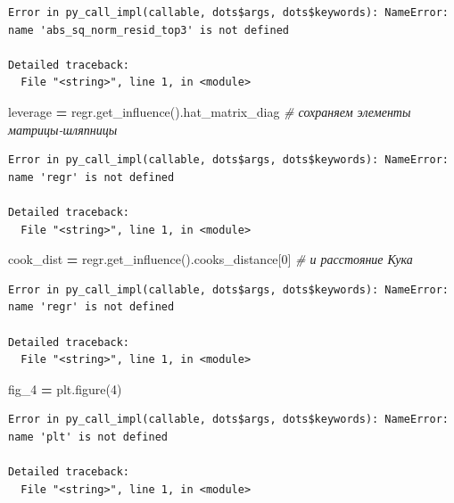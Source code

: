 \documentclass[]{book}
\newenvironment{Shaded}{\begin{snugshade}}{\end{snugshade}}
\newcommand{\CommentTok}[1]{\textcolor[rgb]{0.56,0.35,0.01}{\textit{#1}}}
\newcommand{\DecValTok}[1]{\textcolor[rgb]{0.00,0.00,0.81}{#1}}
\newcommand{\NormalTok}[1]{#1}
\newcommand{\OperatorTok}[1]{\textcolor[rgb]{0.81,0.36,0.00}{\textbf{#1}}}
\begin{document}
\begin{verbatim}
Error in py_call_impl(callable, dots$args, dots$keywords): NameError: name 'abs_sq_norm_resid_top3' is not defined

Detailed traceback: 
  File "<string>", line 1, in <module>
\end{verbatim}

\begin{Shaded}
\begin{Highlighting}[]
\NormalTok{leverage }\OperatorTok{=}\NormalTok{ regr.get_influence().hat_matrix_diag }\CommentTok{# сохраняем элементы матрицы-шляпницы}
\end{Highlighting}
\end{Shaded}

\begin{verbatim}
Error in py_call_impl(callable, dots$args, dots$keywords): NameError: name 'regr' is not defined

Detailed traceback: 
  File "<string>", line 1, in <module>
\end{verbatim}

\begin{Shaded}
\begin{Highlighting}[]
\NormalTok{cook_dist }\OperatorTok{=}\NormalTok{ regr.get_influence().cooks_distance[}\DecValTok{0}\NormalTok{] }\CommentTok{# и расстояние Кука}
\end{Highlighting}
\end{Shaded}

\begin{verbatim}
Error in py_call_impl(callable, dots$args, dots$keywords): NameError: name 'regr' is not defined

Detailed traceback: 
  File "<string>", line 1, in <module>
\end{verbatim}

\begin{Shaded}
\begin{Highlighting}[]
\NormalTok{fig_4 }\OperatorTok{=}\NormalTok{ plt.figure(}\DecValTok{4}\NormalTok{)}
\end{Highlighting}
\end{Shaded}

\begin{verbatim}
Error in py_call_impl(callable, dots$args, dots$keywords): NameError: name 'plt' is not defined

Detailed traceback: 
  File "<string>", line 1, in <module>
\end{verbatim}
\end{document}
